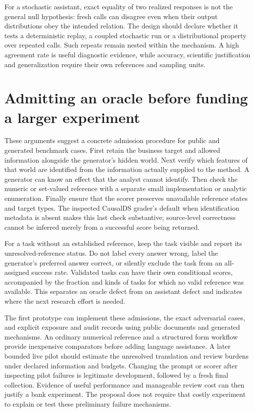 For a stochastic assistant, exact equality of two realized responses is not
the general null hypothesis: fresh calls can disagree even when their output
distributions obey the intended relation. The design should declare whether
it tests a deterministic replay, a coupled stochastic run or a distributional
property over repeated calls. Such repeats remain nested within the
mechanism. A high agreement rate is useful diagnostic evidence, while
accuracy, scientific justification and generalization require their own
references and sampling units.

\section{Admitting an oracle before funding a larger experiment}
\label{exec14:l7-oracles}

These arguments suggest a concrete admission procedure for public and
generated benchmark cases. First retain the business target and allowed
information alongside the generator's hidden world. Next verify which
features of that world are identified from the information actually supplied
to the method. A generator can know an effect that the analyst cannot
identify. Then check the numeric or set-valued reference with a separate
small implementation or analytic enumeration. Finally ensure that the
scorer preserves unavailable reference states and target types. The
inspected CausalDS grader's default when identification metadata is absent
makes this last check substantive; source-level correctness cannot be
inferred merely from a successful score being returned.
\citep{exec14_evaluation_code,exec14_l7_exposure_audit}

For a task without an established reference, keep the task visible and
report its unresolved-reference status. Do not label every answer wrong,
label the generator's preferred answer correct, or silently exclude the
task from an all-assigned success rate. Validated tasks can have their own
conditional scores, accompanied by the fraction and kinds of tasks for
which no valid reference was available. This separates an oracle defect
from an assistant defect and indicates where the next research effort is
needed.

The first prototype can implement these admissions, the exact adversarial
cases, and explicit exposure and audit records using public documents and
generated mechanisms. An ordinary numerical reference and a structured
form workflow provide inexpensive comparators before adding language
assistance. A later bounded live pilot should estimate the unresolved
translation and review burdens under declared information and budgets.
Changing the prompt or scorer after inspecting pilot failures is legitimate
development, followed by a fresh final collection. Evidence of useful
performance and manageable review cost can then justify a bank experiment.
The proposal does not require that costly experiment to explain or test
these preliminary failure mechanisms.

\label{exec14:l7-development-end}
